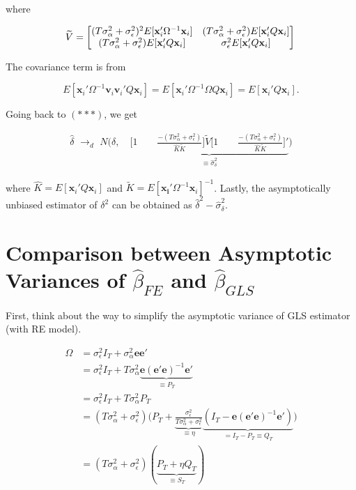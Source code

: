 \documentclass[12pt]{article}
\begin{document}
where 

\[
\widetilde{V} =  \begin{bmatrix}
(T\sigma_\alpha^2 + \sigma_\epsilon^2)^2 E[\mathbf{x}_i' \Omega^{-1} \mathbf{x}_i] & (T\sigma_\alpha^2 + \sigma_\epsilon^2) E[\mathbf{x}_i' Q \mathbf{x}_i] \\
 (T\sigma_\alpha^2 + \sigma_\epsilon^2) E[\mathbf{x}_i' Q \mathbf{x}_i] & \sigma_\epsilon^2 E[\mathbf{x}_i' Q \mathbf{x}_i]
\end{bmatrix} \\
\]

The covariance term is from 

\[
E[\mathbf{x}_i'\Omega^{-1}\mathbf{v}_i \mathbf{v}_i' Q \mathbf{x}_i] = E[\mathbf{x}_i' \Omega^{-1} \Omega Q \mathbf{x}_i] = E[\mathbf{x}_i' Q \mathbf{x}_i].
\]



Going back to $(***)$, we get

\begin{align*}
\widehat{\delta} \,\,  \rightarrow_d \,\, N\bigg(\delta, \quad \underbrace{   \bigg [1 \qquad \frac{-(T\sigma_\alpha^2 + \sigma_\epsilon^2)}{\widehat{K}\widetilde{K}} \bigg ]  \widetilde{V}   \bigg [1 \qquad \frac{-(T\sigma_\alpha^2 + \sigma_\epsilon^2)}{\widehat{K}\widetilde{K}} \bigg ]' }_{\equiv \widehat{\sigma}_\delta^2}\bigg)
\end{align*}

where $\widehat{K} = E[\mathbf{x}_i' Q \mathbf{x}_i]$ and $\widetilde{K}=E[\mathbf{x_i}' \Omega^{-1} \mathbf{x}_i]^{-1}$. Lastly, the asymptotically unbiased estimator of $\delta^2$ can be obtained as $\widehat{\delta}^2 - \widehat{\sigma}_\delta^2$.




\section*{Comparison between Asymptotic Variances of $\widehat{\beta}_{FE}$ and $\widehat{\beta}_{GLS}$}

First, think about the way to simplify the asymptotic variance of GLS estimator (with RE model).

\begin{align*}
\Omega & = \sigma_\epsilon^2 I_T  +  \sigma_\alpha^2 \mathbf{e}\mathbf{e}'\\
&= \sigma_\epsilon^2 I_T  + T \sigma_\alpha^2\underbrace{ \mathbf{e}(\mathbf{e}'\mathbf{e})^{-1} \mathbf{e}'}_{\equiv P_T}\\
&= \sigma_\epsilon^2 I_T + T\sigma_\alpha^2 P_T\\
&= (T\sigma_\alpha^2 + \sigma_\epsilon^2) \bigg( P_T + \underbrace{\frac{\sigma_\epsilon^2}{T\sigma_\alpha^2 + \sigma_\epsilon^2}}_{\equiv \eta} \underbrace{(I_T - \mathbf{e}(\mathbf{e}' \mathbf{e})^{-1} \mathbf{e}' )}_{= I_T - P_T \equiv Q_T} \bigg)\\
&= (T\sigma_\alpha^2 + \sigma_\epsilon^2 ) (\underbrace{P_T + \eta Q_T}_{\equiv S_T})
\end{align*}
\end{document}
